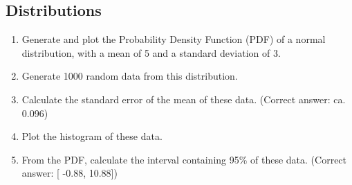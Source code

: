 \subsection*{Distributions}


\begin{enumerate}
  \item  Generate and plot the Probability Density Function (PDF) of a normal distribution, with a mean of 5 and a standard deviation of 3.
  \item  Generate 1000 random data from this distribution.
  \item  Calculate the standard error of the mean of these data.
    (Correct answer: ca. 0.096)

  \item  Plot the histogram of these data.
  \item  From the PDF, calculate the interval containing 95\% of these data.
    (Correct answer: [ -0.88, 10.88])
\end{enumerate}

